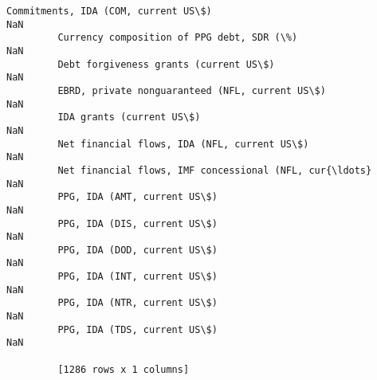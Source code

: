 \documentclass[11pt]{article}
\begin{document}
\begin{Verbatim}[commandchars=\\\{\}]
         Commitments, IDA (COM, current US\$)                                                      NaN
         Currency composition of PPG debt, SDR (\%)                                                NaN
         Debt forgiveness grants (current US\$)                                                    NaN
         EBRD, private nonguaranteed (NFL, current US\$)                                           NaN
         IDA grants (current US\$)                                                                 NaN
         Net financial flows, IDA (NFL, current US\$)                                              NaN
         Net financial flows, IMF concessional (NFL, cur{\ldots}                                       NaN
         PPG, IDA (AMT, current US\$)                                                              NaN
         PPG, IDA (DIS, current US\$)                                                              NaN
         PPG, IDA (DOD, current US\$)                                                              NaN
         PPG, IDA (INT, current US\$)                                                              NaN
         PPG, IDA (NTR, current US\$)                                                              NaN
         PPG, IDA (TDS, current US\$)                                                              NaN
         
         [1286 rows x 1 columns]
\end{Verbatim}
            
\end{document}
